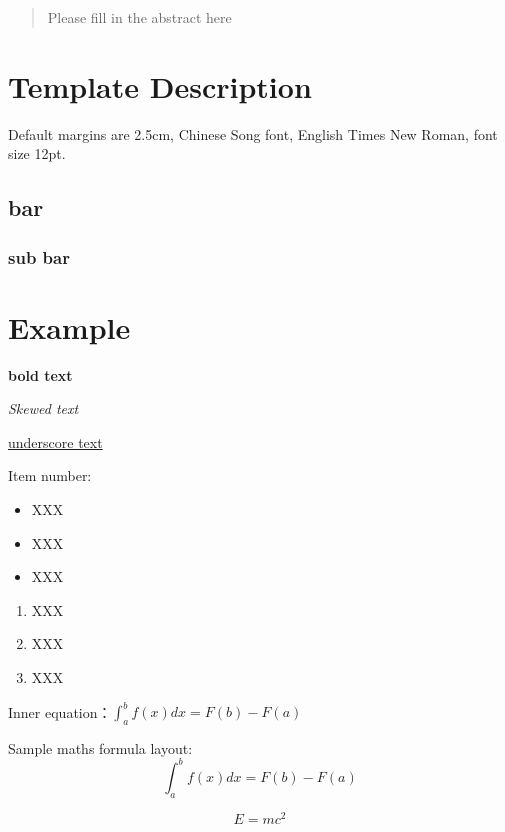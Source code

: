 \documentclass[12pt,hyperref,a4paper,UTF8]{article}
\begin{document}
\cover
\thispagestyle{empty}%
\newpage
\begin{abstract}
    Please fill in the abstract here
\end{abstract}


\newpage
\tableofcontents

\newpage

\section{Template Description}
Default margins are 2.5cm, Chinese Song font, English Times New Roman, font size 12pt.
\subsection{bar}
\subsubsection{sub bar}
\section{Example}
\textbf{bold text}

\textit{Skewed text}

\underline{underscore text}

Item number:

\begin{itemize}
    \item XXX
    \item XXX
    \item XXX
\end{itemize}

\begin{enumerate}
    \item XXX
    \item XXX
    \item XXX
\end{enumerate}

Inner equation：$\int_a^b f(x)dx = F(b)-F(a)$

Sample maths formula layout:
\begin{equation}\label{eq:1}
    \int_a^b f(x)dx = F(b)-F(a)
\end{equation}

\begin{equation}\label{eq:2}
    E = mc^2
\end{equation}
\end{document}
